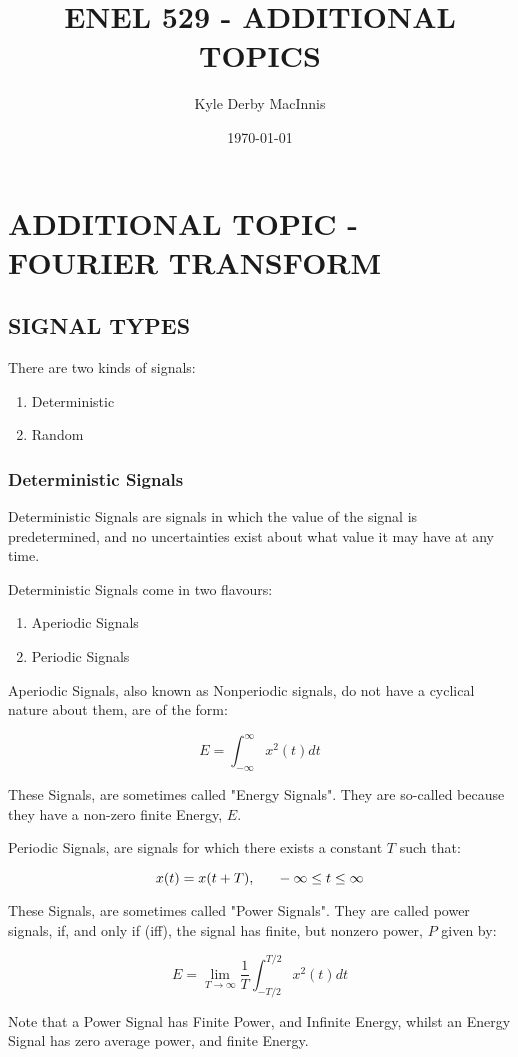 

\title{ENEL 529 - ADDITIONAL TOPICS}
\author{Kyle Derby MacInnis}
\date{\today}


\maketitle


\section*{ADDITIONAL TOPIC - FOURIER TRANSFORM}

 \subsection{SIGNAL TYPES}
 	There are two kinds of signals:
 	\begin{enumerate}
 	\item Deterministic
 	\item Random
 	\end{enumerate}

 	\subsubsection{Deterministic Signals}
	 	Deterministic Signals are signals in which the value of the signal is predetermined, and no uncertainties exist about what value it may have at any time.

 		Deterministic Signals come in two flavours:
 		\begin{enumerate}
 		\item Aperiodic Signals
 		\item Periodic Signals
 		\end{enumerate}

	 		Aperiodic Signals, also known as Nonperiodic signals, do not have a cyclical nature about them, are of the form:

 			\[E = \int_{-\infty}^{\infty}x^2(t) dt\]

 			These Signals, are sometimes called "Energy Signals". They are so-called because they have a non-zero finite Energy, $E$.

 			Periodic Signals, are signals for which there exists a constant $T$ such that:

 			\[x(t) = x(t + T), \indent -\infty \le t \le \infty\]

 			These Signals, are sometimes called "Power Signals". They are called power signals, if, and only if (iff), the signal has finite, but nonzero power, $P$ given by:


 			\[E = \lim_{T\rightarrow\infty}\frac{1}{T}\int_{-T/2}^{T/2}x^2(t)dt\]


 		Note that a Power Signal has Finite Power, and Infinite Energy, whilst an Energy Signal has zero average power, and finite Energy.

 			
